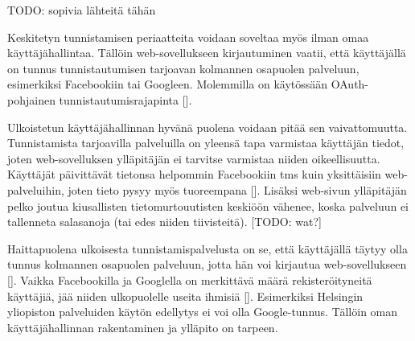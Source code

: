 TODO: sopivia lähteitä tähän

Keskitetyn tunnistamisen periaatteita voidaan soveltaa myös ilman omaa käyttäjähallintaa. Tällöin web-sovellukseen kirjautuminen vaatii, että käyttäjällä on tunnus tunnistautumisen tarjoavan kolmannen osapuolen palveluun, esimerkiksi Facebookiin tai Googleen. Molemmilla on käytössään OAuth-pohjainen tunnistautumisrajapinta [].

Ulkoistetun käyttäjähallinnan hyvänä puolena voidaan pitää sen vaivattomuutta. Tunnistamista tarjoavilla palveluilla on yleensä tapa varmistaa käyttäjän tiedot, joten web-sovelluksen ylläpitäjän ei tarvitse varmistaa niiden oikeellisuutta. Käyttäjät päivittävät tietonsa helpommin Facebookiin tms kuin yksittäisiin web-palveluihin, joten tieto pysyy myös tuoreempana []. Lisäksi web-sivun ylläpitäjän pelko joutua kiusallisten tietomurtouutisten keskiöön vähenee, koska palveluun ei tallenneta salasanoja (tai edes niiden tiivisteitä). [TODO: wat?]

Haittapuolena ulkoisesta tunnistamispalvelusta on se, että käyttäjällä täytyy olla tunnus kolmannen osapuolen palveluun, jotta hän voi kirjautua web-sovellukseen []. Vaikka Facebookilla ja Googlella on merkittävä määrä rekisteröityneitä käyttäjiä, jää niiden ulkopuolelle useita ihmisiä []. Esimerkiksi Helsingin yliopiston palveluiden käytön edellytys ei voi olla Google-tunnus. Tällöin oman käyttäjähallinnan rakentaminen ja ylläpito on tarpeen.